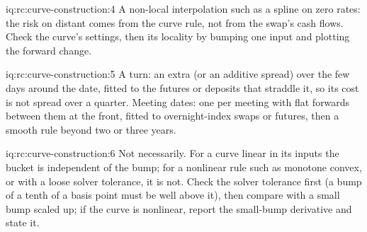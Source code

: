 \begin{solution}{iq:rc:curve-construction:4}
A non-local interpolation such as a spline on zero rates: the risk on distant
 comes from the curve rule, not from the swap's cash flows. Check the
curve's settings, then its locality by bumping one input and plotting the
forward change.
\end{solution}

\begin{solution}{iq:rc:curve-construction:5}
A turn: an extra  (or an additive spread) over the few days around the
date, fitted to the futures or deposits that straddle it, so its cost is not
spread over a quarter. Meeting dates: one  per meeting with flat
forwards between them at the front, fitted to overnight-index swaps or
futures, then a smooth rule beyond two or three years.
\end{solution}

\begin{solution}{iq:rc:curve-construction:6}
Not necessarily. For a curve linear in its inputs the bucket is independent of
the bump; for a nonlinear rule such as monotone convex, or with a loose solver
tolerance, it is not. Check the solver tolerance first (a bump of a tenth of a
basis point must be well above it), then compare with a small bump scaled up;
if the curve is nonlinear, report the small-bump derivative and state it.
\end{solution}
